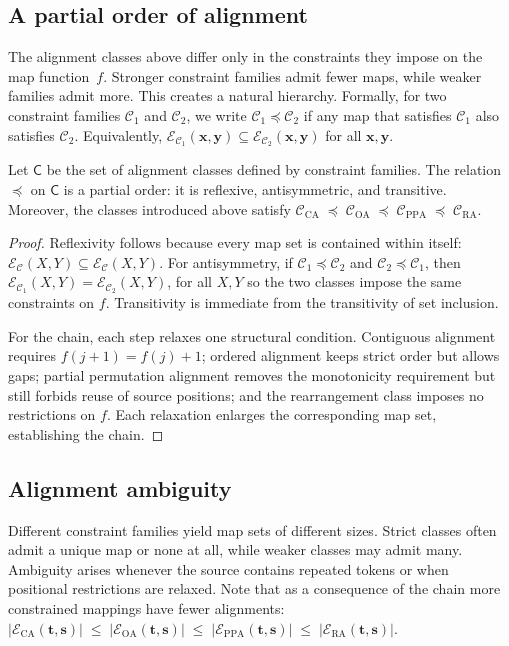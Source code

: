 \subsection{A partial order of alignment}

The alignment classes above differ only in the constraints they impose on the
map function~$f$. Stronger constraint families admit fewer maps,
while weaker families admit more. This creates a natural hierarchy. Formally, for two constraint families $\mathcal{C}_1$ and $\mathcal{C}_2$, we
write $\mathcal{C}_1 \preceq \mathcal{C}_2$ if any map that satisfies
$\mathcal{C}_1$ also satisfies $\mathcal{C}_2$. Equivalently, $\mathcal{E}_{\mathcal{C}_1}(\mathbf{x},\mathbf{y}) \subseteq \mathcal{E}_{\mathcal{C}_2}(\mathbf{x},\mathbf{y})$ for all $\mathbf{x},\mathbf{y}.$

\begin{theorem}
Let $\mathsf{C}$ be the set of alignment classes defined by constraint
families. The relation $\preceq$ on $\mathsf{C}$ is a partial order: it is
reflexive, antisymmetric, and transitive. Moreover, the classes introduced
above satisfy $ \mathcal{C}_{\mathrm{CA}} \;\preceq\; \mathcal{C}_{\mathrm{OA}} \;\preceq\; \mathcal{C}_{\mathrm{PPA}} \;\preceq\; \mathcal{C}_{\mathrm{RA}}.$
\end{theorem}

\begin{proof}
Reflexivity follows because every map set is contained within itself: $\mathcal{E}_{\mathcal{C}}(X,Y) \subseteq \mathcal{E}_{\mathcal{C}}(X,Y).$ For antisymmetry, if $\mathcal{C}_1 \preceq \mathcal{C}_2$ and
$\mathcal{C}_2 \preceq \mathcal{C}_1$, then
$
\mathcal{E}_{\mathcal{C}_1}(X,Y) = \mathcal{E}_{\mathcal{C}_2}(X,Y)$, for all $X,Y$ so the two classes impose the same constraints on $f$. Transitivity is immediate from the transitivity of set inclusion.

For the chain, each step relaxes one structural condition. Contiguous alignment requires $f(j{+}1)=f(j)+1$; ordered alignment keeps strict order but allows gaps; partial permutation alignment removes the monotonicity requirement but still forbids reuse of source positions; and the rearrangement class imposes no restrictions on $f$. Each relaxation enlarges the corresponding map set, establishing the chain.
\end{proof}

\subsection{Alignment ambiguity}
Different constraint families yield map sets of different sizes. Strict classes often admit a unique map or none at all, while weaker classes may admit many.  Ambiguity arises whenever the source contains repeated tokens or when positional restrictions are relaxed. Note that as a consequence of the chain more constrained mappings have fewer alignments: $|\mathcal{E}_{\mathrm{CA}}(\mathbf{t},\mathbf{s})| \;\le\; |\mathcal{E}_{\mathrm{OA}}(\mathbf{t},\mathbf{s})|\;\le\; |\mathcal{E}_{\mathrm{PPA}}(\mathbf{t},\mathbf{s})| \;\le\; |\mathcal{E}_{\mathrm{RA}}(\mathbf{t},\mathbf{s})|$.

